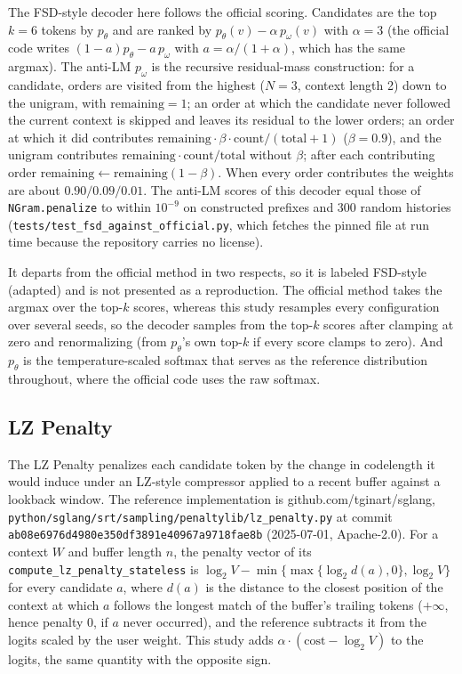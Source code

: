 \documentclass[make,article,submit,pdftex]{Definitions/mdpi}
\begin{document}
The FSD-style decoder here follows the official scoring. Candidates are the top $k{=}6$ tokens by $p_\theta$ and are ranked by $p_\theta(v)-\alpha\,p_\omega(v)$ with $\alpha{=}3$ (the official code writes $(1{-}a)p_\theta-a\,p_\omega$ with $a=\alpha/(1{+}\alpha)$, which has the same argmax). The anti-LM $p_\omega$ is the recursive residual-mass construction: for a candidate, orders are visited from the highest ($N{=}3$, context length 2) down to the unigram, with $\text{remaining}=1$; an order at which the candidate never followed the current context is skipped and leaves its residual to the lower orders; an order at which it did contributes $\text{remaining}\cdot\beta\cdot\text{count}/(\text{total}{+}1)$ ($\beta{=}0.9$), and the unigram contributes $\text{remaining}\cdot\text{count}/\text{total}$ without $\beta$; after each contributing order $\text{remaining}\leftarrow\text{remaining}(1-\beta)$. When every order contributes the weights are about $0.90/0.09/0.01$. The anti-LM scores of this decoder equal those of \texttt{NGram.penalize} to within $10^{-9}$ on constructed prefixes and 300 random histories (\texttt{tests/test\_\allowbreak{}fsd\_\allowbreak{}against\_\allowbreak{}official.py}, which fetches the pinned file at run time because the repository carries no license).

It departs from the official method in two respects, so it is labeled FSD-style (adapted) and is not presented as a reproduction. The official method takes the argmax over the top-$k$ scores, whereas this study resamples every configuration over several seeds, so the decoder samples from the top-$k$ scores after clamping at zero and renormalizing (from $p_\theta$'s own top-$k$ if every score clamps to zero). And $p_\theta$ is the temperature-scaled softmax that serves as the reference distribution throughout, where the official code uses the raw softmax.

\subsection{LZ Penalty}
\label{app:lz}
The LZ Penalty \cite{ginart2025lzpenalty} penalizes each candidate token by the change in codelength it would induce under an LZ-style compressor applied to a recent buffer against a lookback window. The reference implementation is github.com/tginart/sglang, \texttt{python/\allowbreak{}sglang/\allowbreak{}srt/\allowbreak{}sampling/\allowbreak{}penaltylib/\allowbreak{}lz\_\allowbreak{}penalty.py} at commit \texttt{ab08e6976d49\allowbreak{}80e350df3891\allowbreak{}e40967a9718f\allowbreak{}ae8b} (2025-07-01, Apache-2.0). For a context $W$ and buffer length $n$, the penalty vector of its \texttt{compute\_lz\_penalty\_stateless} is $\log_2V-\min\{\max\{\log_2 d(a),0\},\log_2V\}$ for every candidate $a$, where $d(a)$ is the distance to the closest position of the context at which $a$ follows the longest match of the buffer's trailing tokens ($+\infty$, hence penalty $0$, if $a$ never occurred), and the reference subtracts it from the logits scaled by the user weight. This study adds $\alpha\cdot(\text{cost}-\log_2V)$ to the logits, the same quantity with the opposite sign.
\end{document}
